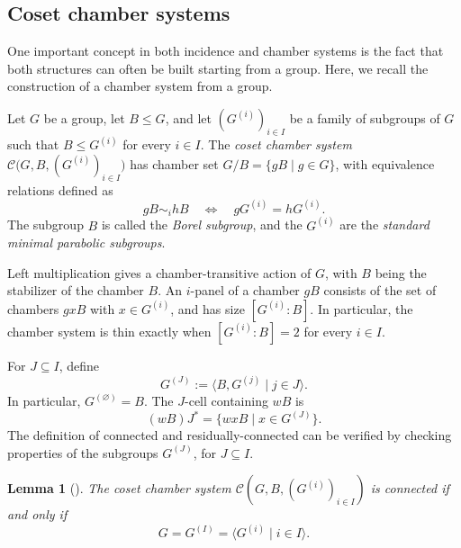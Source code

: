 \documentclass[11pt,letterpaper]{amsart}
\newtheorem{lemma}[prop]{Lemma}
\newcommand{\CC}{\mathcal{C}}
\begin{document}
\subsection{Coset chamber systems}\label{sec:CosetChamberSystem}

One important concept in both incidence and chamber systems is the fact that both structures can often be built starting from a group. Here, we recall the construction of a chamber system from a group.

Let $G$ be a group, let $B\leq G$, and let $(G^{(i)})_{i\in I}$ be a family
of subgroups of $G$ such that $B\leq G^{(i)}$ for every $i\in I$.  The
\emph{coset chamber system}
    $\CC\bigl(G,B,(G^{(i)})_{i\in I}\bigr)$
has chamber set $G/B=\{gB\mid g\in G\}$, with equivalence relations defined as
\[
    gB\sim_i hB
    \quad\Longleftrightarrow\quad
    gG^{(i)}=hG^{(i)}.
\]
The subgroup $B$ is called the \emph{Borel subgroup}, and the $G^{(i)}$ are the
\emph{standard minimal parabolic subgroups}.

Left multiplication gives a chamber-transitive action of $G$, with
$B$ being the stabilizer of the chamber $B$.  An $i$-panel of a chamber $gB$ consists of the set of chambers
$gxB$ with $x\in G^{(i)}$, and has size $[G^{(i)}:B]$.  In particular, the
chamber system is thin exactly when $[G^{(i)}:B]=2$ for every $i\in I$.

For $J\subseteq I$, define
    \[G^{(J)}:=\bigl\langle B,G^{(j)}\mid j\in J\bigr\rangle.\]
In particular, $G^{(\varnothing)}=B$.  The $J$-cell containing $wB$ is
\begin{equation}
\label{eq:J-cell-coset-system}
    (wB)J^*=\{wxB\mid x\in G^{(J)}\}.
\end{equation}
The definition of connected and residually-connected can be verified by checking properties of the subgroups $G^{(J)}$, for $J\subseteq I$.

\begin{lemma}[{\cite[Lemma~3.6.7]{buekenhout2013diagram}}]
\label{lem:connected-coset-system}
The coset chamber system $\CC(G,B,(G^{(i)})_{i\in I})$ is connected if and only if
\[
    G=G^{(I)}=\langle G^{(i)}\mid i\in I\rangle.
\]
\end{lemma}
\end{document}
